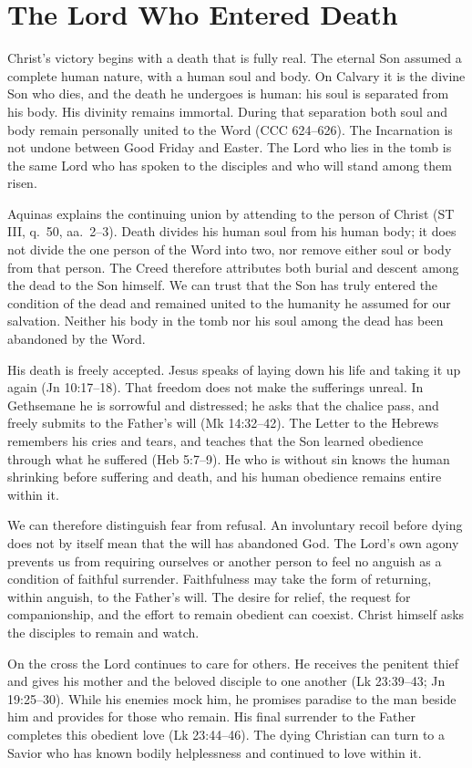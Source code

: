 \section{The Lord Who Entered Death}

Christ's victory begins with a death that is fully real. The eternal Son assumed a complete human nature, with a human soul and body. On Calvary it is the divine Son who dies, and the death he undergoes is human: his soul is separated from his body. His divinity remains immortal. During that separation both soul and body remain personally united to the Word (CCC 624--626). The Incarnation is not undone between Good Friday and Easter. The Lord who lies in the tomb is the same Lord who has spoken to the disciples and who will stand among them risen.

Aquinas explains the continuing union by attending to the person of Christ (ST III, q.~50, aa.~2--3). Death divides his human soul from his human body; it does not divide the one person of the Word into two, nor remove either soul or body from that person. The Creed therefore attributes both burial and descent among the dead to the Son himself. We can trust that the Son has truly entered the condition of the dead and remained united to the humanity he assumed for our salvation. Neither his body in the tomb nor his soul among the dead has been abandoned by the Word.

His death is freely accepted. Jesus speaks of laying down his life and taking it up again (Jn 10:17--18). That freedom does not make the sufferings unreal. In Gethsemane he is sorrowful and distressed; he asks that the chalice pass, and freely submits to the Father's will (Mk 14:32--42). The Letter to the Hebrews remembers his cries and tears, and teaches that the Son learned obedience through what he suffered (Heb 5:7--9). He who is without sin knows the human shrinking before suffering and death, and his human obedience remains entire within it.

We can therefore distinguish fear from refusal. An involuntary recoil before dying does not by itself mean that the will has abandoned God. The Lord's own agony prevents us from requiring ourselves or another person to feel no anguish as a condition of faithful surrender. Faithfulness may take the form of returning, within anguish, to the Father's will. The desire for relief, the request for companionship, and the effort to remain obedient can coexist. Christ himself asks the disciples to remain and watch.

On the cross the Lord continues to care for others. He receives the penitent thief and gives his mother and the beloved disciple to one another (Lk 23:39--43; Jn 19:25--30). While his enemies mock him, he promises paradise to the man beside him and provides for those who remain. His final surrender to the Father completes this obedient love (Lk 23:44--46). The dying Christian can turn to a Savior who has known bodily helplessness and continued to love within it.

